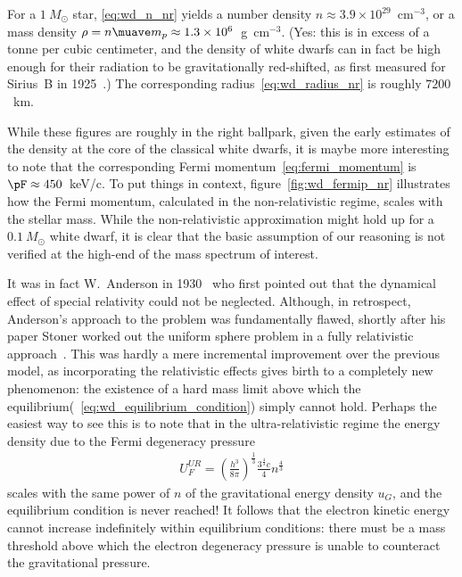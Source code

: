 \begin{marginfigure}
	
	\caption{Estimate for the Fermi momentum $\pF$ as a function of the mass of a
    white dwarf in the non-relativistic limit---this is calculated by simply
    plugging the non-relativistic expression for the number density~\eqref{eq:wd_n_nr}
    into the formula for the Fermi momentum~\eqref{eq:fermi_momentum}. We note
    that the hypothesis that the electrons in the Fermi gas are not relativistic
    $\pF \ll m_e c$, in fact, does not hold over most of the mass range of
    interest.}
    \label{fig:wd_fermip_nr}
\end{marginfigure}

For a $1~M_\odot$ star, \eqref{eq:wd_n_nr} yields a number density
$n \approx 3.9 \times 10^{29}$~cm$^{-3}$, or a mass density
$\rho = n \muave m_p \approx 1.3 \times 10^6$~g~cm$^{-3}$.
(Yes: this is in excess of a tonne per cubic centimeter, and the density of white
dwarfs can in fact be high enough for their radiation to be gravitationally red-shifted,
as first measured for Sirius~B in 1925~\cite{1925PNAS...11..382A}.) The corresponding
radius~\eqref{eq:wd_radius_nr} is roughly $7200$~km.

While these figures are roughly in the right ballpark, given the early estimates
of the density at the core of the classical white dwarfs, it is maybe more
interesting to note that the corresponding Fermi momentum~\eqref{eq:fermi_momentum}
is $\pF \approx 450$~keV/c. To put things in context, figure~\ref{fig:wd_fermip_nr}
illustrates how the Fermi momentum, calculated in the non-relativistic regime,
scales with the stellar mass. While the non-relativistic approximation might
hold up for a $0.1~M_\odot$ white dwarf, it is clear that the basic assumption of
our reasoning is not verified at the high-end of the mass spectrum of interest.

It was in fact W.~Anderson in 1930~\cite{1929ZPhy...56..851A} who first pointed
out that the dynamical effect of special relativity could not be neglected.
Although, in retrospect, Anderson's approach to the problem was fundamentally
flawed, shortly after his paper Stoner worked out the uniform sphere problem in
a fully relativistic approach~\cite{1930LEDPM...9..944S}. This was hardly a mere
incremental improvement over the previous model, as incorporating the relativistic
effects gives birth to a completely new phenomenon: the existence of a hard mass
limit above which the equilibrium(~\ref{eq:wd_equilibrium_condition}) simply cannot
hold. Perhaps the easiest way to see this is to note that in the ultra-relativistic
regime the energy density due to the Fermi degeneracy pressure
\begin{align*}
	U_F^{UR} = \left( \frac{h^3}{8\pi} \right)^\frac{1}{3}
	\frac{3^\frac{4}{3} c}{4} n^\frac{4}{3}
\end{align*}
scales with the same power of $n$ of the gravitational energy density $u_G$, and the
equilibrium condition is never reached! It follows that the electron kinetic
energy cannot increase indefinitely within equilibrium conditions: there must be
a mass threshold above which the electron degeneracy pressure is unable to counteract
the gravitational pressure.

